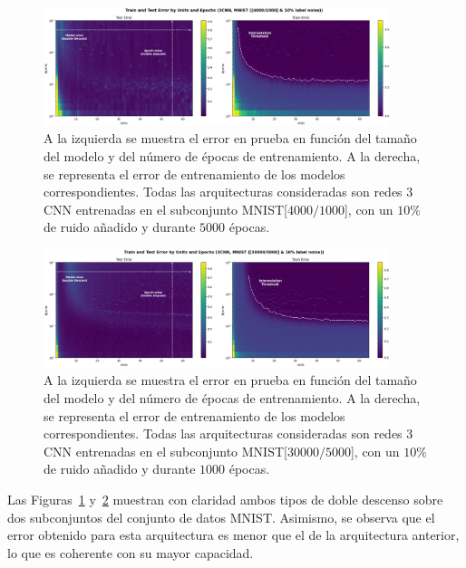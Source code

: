 \begin{figure}[h]
    \centering
    \includegraphics[width=0.9\textwidth]{img/experiments/model-epoch3CNNMNIST4k.png}
    \caption[Doble descenso en función del tamaño del modelo y del número de épocas para la red $3$CNN y un subconjunto de MNIST.]{A la izquierda se muestra el error en prueba en función del tamaño del modelo y del número de épocas de entrenamiento. A la derecha, se representa el error de entrenamiento de los modelos correspondientes. Todas las arquitecturas consideradas son redes $3$CNN entrenadas en el subconjunto MNIST[$4000/1000$], con un $10\%$ de ruido añadido y durante $5000$ épocas.}\label{fig:model-epoch3CNNMNIST4k}
\end{figure}

\begin{figure}[h]
    \centering
    \includegraphics[width=0.9\textwidth]{img/experiments/model-epoch3CNNMNIST30k.png}
    \caption[Doble descenso en función del tamaño del modelo y del número de épocas para la red $3$CNN y un subconjunto de MNIST.]{A la izquierda se muestra el error en prueba en función del tamaño del modelo y del número de épocas de entrenamiento. A la derecha, se representa el error de entrenamiento de los modelos correspondientes. Todas las arquitecturas consideradas son redes $3$CNN entrenadas en el subconjunto MNIST[$30000/5000$], con un $10\%$ de ruido añadido y durante $1000$ épocas.}\label{fig:model-epoch3CNNMNIST30k}
\end{figure}

Las Figuras~\ref{fig:model-epoch3CNNMNIST4k} y~\ref{fig:model-epoch3CNNMNIST30k} muestran con claridad ambos tipos de doble descenso sobre dos subconjuntos del conjunto de datos MNIST. Asimismo, se observa que el error obtenido para esta arquitectura es menor que el de la arquitectura anterior, lo que es coherente con su mayor capacidad.\newline

